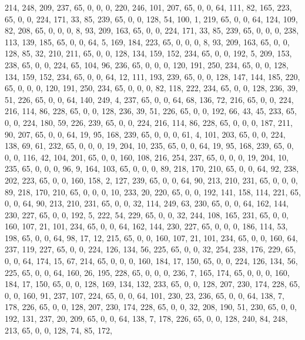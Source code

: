 \begin{DoxyCode}
       214, 248, 209, 237, 65, 0, 0, 0, 220, 246, 101, 207, 65, 0, 0, 64, 111, 82, 165, 223, 65, 0, 0, 224, 171,
       33, 85, 239, 65, 0, 0, 128, 54, 100, 1, 219, 65, 0, 0, 64, 124, 109, 82, 208, 65, 0, 0, 0, 8, 93, 209, 163,
       65, 0, 0, 224, 171, 33, 85, 239, 65, 0, 0, 0, 238, 113, 139, 185, 65, 0, 0, 64, 5, 169, 184, 223, 65, 0, 0,
       0, 8, 93, 209, 163, 65, 0, 0, 128, 85, 32, 210, 211, 65, 0, 0, 128, 134, 159, 152, 234, 65, 0, 0, 192, 5,
       209, 153, 238, 65, 0, 0, 224, 65, 104, 96, 236, 65, 0, 0, 0, 120, 191, 250, 234, 65, 0, 0, 128, 134, 159, 152,
       234, 65, 0, 0, 64, 12, 111, 193, 239, 65, 0, 0, 128, 147, 144, 185, 220, 65, 0, 0, 0, 120, 191, 250, 234,
       65, 0, 0, 0, 82, 118, 222, 234, 65, 0, 0, 128, 236, 39, 51, 226, 65, 0, 0, 64, 140, 249, 4, 237, 65, 0, 0, 64,
       68, 136, 72, 216, 65, 0, 0, 224, 216, 114, 86, 228, 65, 0, 0, 128, 236, 39, 51, 226, 65, 0, 0, 192, 66, 43,
       45, 233, 65, 0, 0, 224, 180, 59, 226, 239, 65, 0, 0, 224, 216, 114, 86, 228, 65, 0, 0, 0, 187, 211, 90,
       207, 65, 0, 0, 64, 19, 95, 168, 239, 65, 0, 0, 0, 61, 4, 101, 203, 65, 0, 0, 224, 138, 69, 61, 232, 65, 0, 0,
       0, 19, 204, 10, 235, 65, 0, 0, 64, 19, 95, 168, 239, 65, 0, 0, 0, 116, 42, 104, 201, 65, 0, 0, 160, 108, 216,
       254, 237, 65, 0, 0, 0, 19, 204, 10, 235, 65, 0, 0, 0, 96, 9, 164, 103, 65, 0, 0, 0, 89, 218, 170, 210, 65,
       0, 0, 64, 92, 238, 202, 223, 65, 0, 0, 160, 158, 2, 127, 239, 65, 0, 0, 64, 90, 213, 210, 231, 65, 0, 0, 0,
       89, 218, 170, 210, 65, 0, 0, 0, 10, 233, 20, 220, 65, 0, 0, 192, 141, 158, 114, 221, 65, 0, 0, 64, 90, 213,
       210, 231, 65, 0, 0, 32, 114, 249, 63, 230, 65, 0, 0, 64, 162, 144, 230, 227, 65, 0, 0, 192, 5, 222, 54, 229,
       65, 0, 0, 32, 244, 108, 165, 231, 65, 0, 0, 160, 107, 21, 101, 234, 65, 0, 0, 64, 162, 144, 230, 227, 65,
       0, 0, 0, 186, 114, 53, 198, 65, 0, 0, 64, 98, 17, 12, 215, 65, 0, 0, 160, 107, 21, 101, 234, 65, 0, 0, 160,
       64, 237, 119, 227, 65, 0, 0, 224, 126, 134, 56, 225, 65, 0, 0, 32, 254, 238, 176, 229, 65, 0, 0, 64, 174, 15,
       67, 214, 65, 0, 0, 0, 160, 184, 17, 150, 65, 0, 0, 224, 126, 134, 56, 225, 65, 0, 0, 64, 160, 26, 195, 228,
       65, 0, 0, 0, 236, 7, 165, 174, 65, 0, 0, 0, 160, 184, 17, 150, 65, 0, 0, 128, 169, 134, 132, 233, 65, 0, 0,
       128, 207, 230, 174, 228, 65, 0, 0, 160, 91, 237, 107, 224, 65, 0, 0, 64, 101, 230, 23, 236, 65, 0, 0, 64,
       138, 7, 178, 226, 65, 0, 0, 128, 207, 230, 174, 228, 65, 0, 0, 32, 208, 190, 51, 230, 65, 0, 0, 192, 131,
       237, 20, 209, 65, 0, 0, 64, 138, 7, 178, 226, 65, 0, 0, 128, 240, 84, 248, 213, 65, 0, 0, 128, 74, 85, 172,

\end{DoxyCode}

